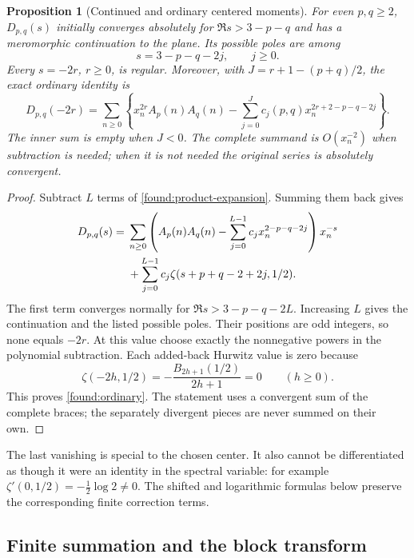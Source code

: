\documentclass[11pt]{article}
\newtheorem{proposition}[theorem]{Proposition}
\theoremstyle{definition}
\theoremstyle{remark}
\numberwithin{equation}{section}
\begin{document}
\begin{proposition}[Continued and ordinary centered moments]
\label{found:regularity}
For even $p,q\ge2$, $D_{p,q}(s)$ initially converges absolutely for
$\Re s>3-p-q$ and has a meromorphic continuation to the plane.
Its possible poles are among
\[
                         s=3-p-q-2j,\qquad j\ge0.
\]
Every $s=-2r$, $r\ge0$, is regular. Moreover, with
$J=r+1-(p+q)/2$, the exact ordinary identity is
\begin{equation}\label{found:ordinary}
 D_{p,q}(-2r)=\sum_{n\ge0}\left\{
 x_n^{2r}A_p(n)A_q(n)
 -\sum_{j=0}^{J}c_j(p,q)x_n^{2r+2-p-q-2j}\right\}.
\end{equation}
The inner sum is empty when $J<0$. The complete summand is
$O(x_n^{-2})$ when subtraction is needed; when it is not needed the
original series is absolutely convergent.
\end{proposition}

\begin{proof}
Subtract $L$ terms of \eqref{found:product-expansion}. Summing them
back gives
\begin{align}\label{found:continuation}
 D_{p,q}(s)={}&\sum_{n\ge0}
 \left(A_p(n)A_q(n)-\sum_{j=0}^{L-1}c_jx_n^{2-p-q-2j}\right)x_n^{-s}
 \notag\\
 &+\sum_{j=0}^{L-1}c_j\zeta(s+p+q-2+2j,1/2).
\end{align}
The first term converges normally for
$\Re s>3-p-q-2L$. Increasing $L$ gives the continuation and the
listed possible poles. Their positions are odd integers, so none
equals $-2r$. At this value choose exactly the nonnegative powers
in the polynomial subtraction. Each added-back Hurwitz value is
zero because
\[
 \zeta(-2h,1/2)=-\frac{B_{2h+1}(1/2)}{2h+1}=0
 \qquad(h\ge0).
\]
This proves \eqref{found:ordinary}. The statement uses a convergent
sum of the complete braces; the separately divergent pieces are
never summed on their own.
\end{proof}

The last vanishing is special to the chosen center. It also cannot
be differentiated as though it were an identity in the spectral
variable: for example $\zeta'(0,1/2)=-\tfrac12\log2\ne0$.
The shifted and logarithmic formulas below preserve the corresponding
finite correction terms.

\subsection{Finite summation and the block transform}
\end{document}

